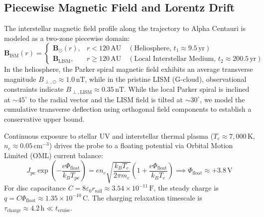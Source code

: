 \documentclass[11pt, a4paper]{article}
\begin{document}
\subsection{Piecewise Magnetic Field and Lorentz Drift}
The interstellar magnetic field profile along the trajectory to Alpha Centauri is modeled as a two-zone piecewise domain:
\begin{equation}
    \mathbf{B}_{\text{ISM}}(r) = 
    \begin{cases}
        \mathbf{B}_{\odot}(r), & r < 120\,\text{AU} \quad (\text{Heliosphere, } t_1 \approx 9.5\,\text{yr}) \\
        \mathbf{B}_{\text{LISM}}, & r \ge 120\,\text{AU} \quad (\text{Local Interstellar Medium, } t_2 \approx 200.5\,\text{yr})
    \end{cases}
\end{equation}
In the heliosphere, the Parker spiral magnetic field exhibits an average transverse magnitude $B_{\perp,\odot} \approx 1.0\,\text{nT}$, while in the pristine LISM (G-cloud), observational constraints indicate $B_{\perp,\text{LISM}} \approx 0.35\,\text{nT}$. While the local Parker spiral is inclined at $\sim 45^\circ$ to the radial vector and the LISM field is tilted at $\sim 30^\circ$, we model the cumulative transverse deflection using orthogonal field components to establish a conservative upper bound.

Continuous exposure to stellar UV and interstellar thermal plasma ($T_e \approx 7,000\,\text{K}$, $n_e \approx 0.05\,\text{cm}^{-3}$) drives the probe to a floating potential via Orbital Motion Limited (OML) current balance:
\begin{equation}
    J_{\text{pe}} \exp\left(-\frac{e \Phi_{\text{float}}}{k_B T_{\text{pe}}}\right) = e n_e \sqrt{\frac{k_B T_e}{2\pi m_e}} \left( 1 + \frac{e \Phi_{\text{float}}}{k_B T_e} \right) \implies \Phi_{\text{float}} \approx +3.8\,\text{V}
\end{equation}
For disc capacitance $C = 8 \varepsilon_0 r_{\text{sail}} \approx 3.54 \times 10^{-11}\,\text{F}$, the steady charge is $q = C \Phi_{\text{float}} \approx 1.35 \times 10^{-10}\,\text{C}$. The charging relaxation timescale is $\tau_{\text{charge}} \approx 4.2\,\text{h} \ll t_{\text{cruise}}$.
\end{document}
